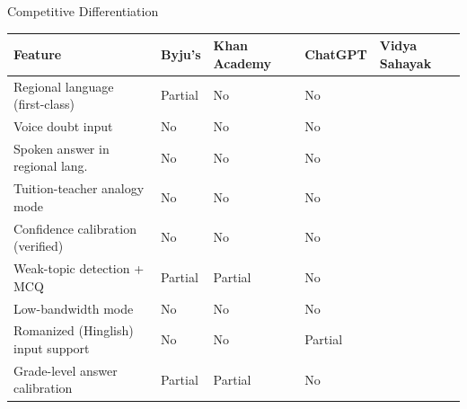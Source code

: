 \documentclass[aspectratio=169, 12pt]{beamer}
\newcommand{\tick}{\textcolor{deepgreen}{\faCheckCircle}}
\begin{document}
\begin{frame}{Competitive Differentiation}
  \renewcommand{\arraystretch}{1.5}
  \begin{tabular}{>{\small}p{}
                  >{\centering\arraybackslash\scriptsize}p{}
                  >{\centering\arraybackslash\scriptsize}p{}
                  >{\centering\arraybackslash\scriptsize}p{}
                  >{\centering\arraybackslash\scriptsize\bfseries}p{}}
    \toprule
    \rowcolor{deepgreen!15}
    Feature & Byju's & Khan Academy & ChatGPT & \textcolor{deepgreen}{Vidya Sahayak}\\
    \midrule
    Regional language (first-class) & Partial & No & No & \tick\\
    \rowcolor{lightgreen!10}
    Voice doubt input & No & No & No & \tick\\
    Spoken answer in regional lang. & No & No & No & \tick\\
    \rowcolor{lightgreen!10}
    Tuition-teacher analogy mode & No & No & No & \tick\\
    Confidence calibration (verified) & No & No & No & \tick\\
    \rowcolor{lightgreen!10}
    Weak-topic detection + MCQ & Partial & Partial & No & \tick\\
    Low-bandwidth mode & No & No & No & \tick\\
    \rowcolor{lightgreen!10}
    Romanized (Hinglish) input support & No & No & Partial & \tick\\
    Grade-level answer calibration & Partial & Partial & No & \tick\\
    \bottomrule
  \end{tabular}
\end{frame}
\end{document}
